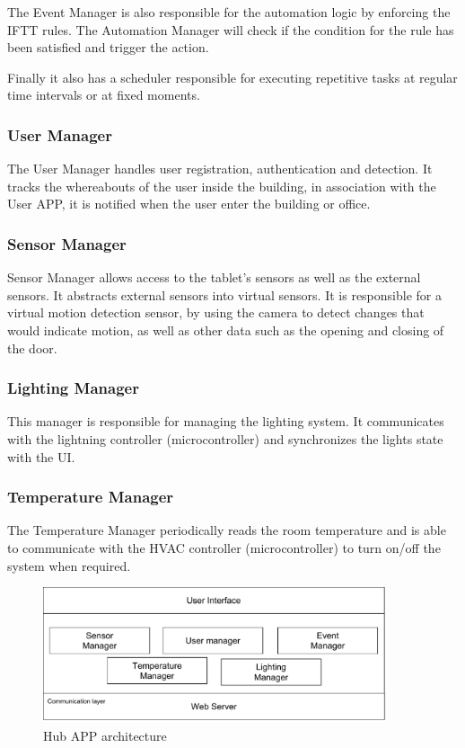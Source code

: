 The Event Manager is also responsible for the automation logic by enforcing the \ac{IFTT} rules. The Automation Manager will check if the condition for the rule has been satisfied and trigger the action. 

Finally it also has a scheduler responsible for executing repetitive tasks at regular time intervals or at fixed moments.


\subsubsection{User Manager}
The User Manager handles user registration, authentication and detection. It tracks the whereabouts of the user inside the building, in association with the User APP, it is notified when the user enter the building or office.


\subsubsection{Sensor Manager}
Sensor Manager allows access to the tablet's sensors as well as the external sensors. It abstracts external sensors into virtual sensors. It is responsible for a virtual motion detection sensor, by using the camera to detect changes that would indicate motion, as well as other data such as the opening and closing of the door.


\subsubsection{Lighting Manager}

This manager is responsible for managing the lighting system. It communicates with the lightning controller (microcontroller) and synchronizes the lights state with the \ac{UI}.

\subsubsection{Temperature Manager}

The Temperature Manager periodically reads the room temperature and is able to communicate with the \ac{HVAC} controller (microcontroller) to turn on/off the system when required.


\begin{figure}[h]
\centering
\includegraphics[width=0.9\textwidth]{Figures/software_hub}
\caption{Hub APP architecture }
\label{software2}
\end{figure}



